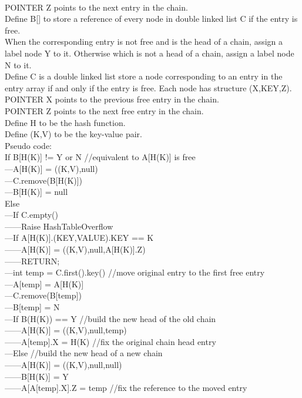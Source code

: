 \documentclass[10pt,twoside,a4paper]{article}
\begin{document}
\begin{itemize}
\\POINTER Z points to the next entry in the chain.
\\Define B[] to store a reference of every node in double linked list C if the entry is free.
\\When the corresponding entry is not free and is the head of a chain, assign a label node Y to it. Otherwise which is not a head of a chain, assign a label node N to it.
\\Define C is a double linked list store a node corresponding to an entry in the entry array if and only if the entry is free. Each node has structure (X,KEY,Z).
\\POINTER X points to the previous free entry in the chain.
\\POINTER Z points to the next free entry in the chain.
\\Define H to be the hash function.
\\Define (K,V) to be the key-value pair.
\\Pseudo code:
\\If B[H(K)] != Y or N //equivalent to A[H(K)] is free
\\---A[H(K)] = ((K,V),null)
\\---C.remove(B[H(K)])
\\---B[H(K)] = null
\\Else
\\---If C.empty()
\\------Raise HashTableOverflow
\\---If A[H(K)].(KEY,VALUE).KEY == K
\\------A[H(K)] = ((K,V),null,A[H(K)].Z) 
\\------RETURN;
\\---int temp = C.first().key() //move original entry to the first free entry
\\---A[temp] = A[H(K)]
\\---C.remove(B[temp])
\\---B[temp] = N
\\---If B(H(K)) == Y //build the new head of the old chain
\\------A[H(K)] = ((K,V),null,temp)
\\------A[temp].X = H(K) //fix the original chain head entry
\\---Else //build the new head of a new chain
\\------A[H(K)] = ((K,V),null,null)	
\\------B[H(K)] = Y
\\------A[A[temp].X].Z = temp //fix the reference to the moved entry

\end{itemize}
\end{document}
